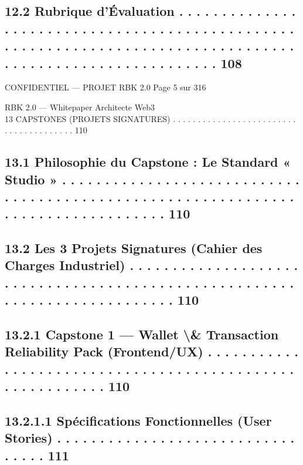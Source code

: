 \documentclass[12pt,landscape,a4paper]{article}
\newenvironment{confidential}
{\begin{tcolorbox}[
    colback=rbkred!5!white,
    colframe=rbkred!75!black,
    title=CONFIDENTIEL,
    fonttitle=\bfseries\color{white},
    coltitle=rbkred!75!black,
    breakable,
    enhanced,
    frame hidden,
    borderline west={2pt}{0pt}{rbkred!75!black}
]}
{\end{tcolorbox}}
\begin{document}
\subsection{12.2    Rubrique d’Évaluation . . . . . . . . . . . . . . . . . . . . . . . . . . . . . . . . . . . . . . . . . . . . . . . . . . . . . . . . . . . . . . . . . . . . . . . . . . . . . . . . . . . . . . . . . . . . . . . . . . . . . . . . . . . 108}
\vspace{0.5em}
\vspace{0.5em}
\vspace{0.5em}
\begin{confidential}CONFIDENTIEL — PROJET RBK 2.0                                                                                Page 5 sur 316\end{confidential}
RBK 2.0 — Whitepaper Architecte Web3\\
\vspace{0.5em}
\vspace{0.5em}
13    CAPSTONES (PROJETS SIGNATURES) . . . . . . . . . . . . . . . . . . . . . . . . . . . . . . . . . . . . . . . 110\\
\subsection{13.1    Philosophie du Capstone : Le Standard « Studio » . . . . . . . . . . . . . . . . . . . . . . . . . . . . . . . . . . . . . . . . . . . . . . . . . . . . . . . . . . . . . . . . . . . . . . . . . . . . . . . . . 110}
\subsection{13.2    Les 3 Projets Signatures (Cahier des Charges Industriel) . . . . . . . . . . . . . . . . . . . . . . . . . . . . . . . . . . . . . . . . . . . . . . . . . . . . . . . . . . . . . . . . . . . . . . . . . . 110}
\subsection{13.2.1            Capstone 1 — Wallet \textbackslash{}& Transaction Reliability Pack (Frontend/UX) . . . . . . . . . . . . . . . . . . . . . . . . . . . . . . . . . . . . . . . . . . . . . . . . . . . . . . . . . 110}
\subsection{13.2.1.1 Spécifications Fonctionnelles (User Stories) . . . . . . . . . . . . . . . . . . . . . . . . . . . . . . . . . 111}
\end{document}

